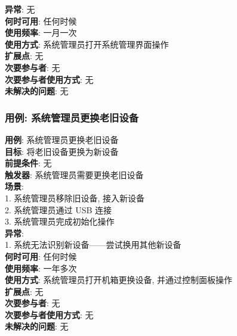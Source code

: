 \documentclass[UTF8]{article}
\begin{document}
\textbf{异常}: 无 \\
\textbf{何时可用}: 任何时候 \\
\textbf{使用频率}: 一月一次 \\
\textbf{使用方式}: 系统管理员打开系统管理界面操作 \\
\textbf{扩展点}: 无 \\
\textbf{次要参与者}: 无 \\
\textbf{次要参与者使用方式}: 无 \\
\textbf{未解决的问题}: 无 \\
				
\subsubsection{用例: 系统管理员更换老旧设备}
\noindent
\textbf{用例}: 系统管理员更换老旧设备
\\
\textbf{目标}: 将老旧设备更换为新设备
\\
\textbf{前提条件}: 无
\\
\textbf{触发器}: 系统管理员需要更换老旧设备
\\
\textbf{场景}: \\
	\hspace*{2em} 1. 系统管理员移除旧设备, 接入新设备 \\
	\hspace*{2em} 2. 系统管理员通过 USB 连接 \\
	\hspace*{2em} 3. 系统管理员完成初始化操作 \\
	
\textbf{异常}: \\
	\hspace*{2em} 1. 系统无法识别新设备——尝试换用其他新设备 \\
\textbf{何时可用}: 任何时候 \\
\textbf{使用频率}: 一年多次 \\
\textbf{使用方式}: 系统管理员打开机箱更换设备, 并通过控制面板操作 \\
\textbf{扩展点}: 无 \\
\textbf{次要参与者}: 无 \\
\textbf{次要参与者使用方式}: 无 \\
\textbf{未解决的问题}: 无 \\
				
\end{document}
